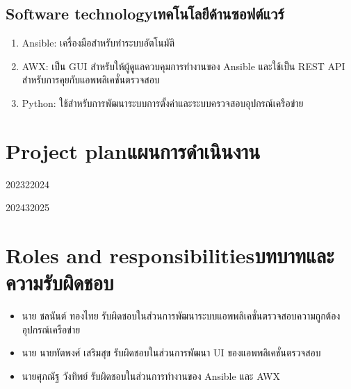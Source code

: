 \subsection{\ifenglish Software technology\else เทคโนโลยีด้านซอฟต์แวร์\fi}
\begin{enumerate}
    \item {Ansible: เครื่องมือสำหรับทำระบบอัตโนมัติ}
    \item {AWX: เป็น GUI สำหรับให้ผู้ดูแลควบคุมการทำงานของ Ansible และใช้เป็น REST API สำหรับการคุยกับแอพพลิเคชั่นตรวจสอบ}
    \item {Python: ใช้สำหรับการพัฒนาระบบการตั้งค่าและระบบครวจสอบอุปกรณ์เครือข่าย}
\end{enumerate}
\section{\ifenglish Project plan\else แผนการดำเนินงาน\fi}

\begin{plan}{11}{2023}{2}{2024}
\end{plan}

\begin{plan}{11}{2024}{3}{2025}
\end{plan}

\section{\ifenglish Roles and responsibilities\else บทบาทและความรับผิดชอบ\fi}
\begin{itemize}
    \item นาย ชลนันต์ ทองไทย รับผิดชอบในส่วนการพัฒนาระบบแอพพลิเคชั่นตรวจสอบความถูกต้องอุปกรณ์เครือข่าย
    \item นาย นายทัตพงศ์ เสริมสุข รับผิดชอบในส่วนการพัฒนา UI ของแอพพลิเคชั่นตรวจสอบ
    \item นายศุภณัฐ วังทิพย์ รับผิดชอบในส่วนการทำงานของ Ansible และ AWX
\end{itemize}

